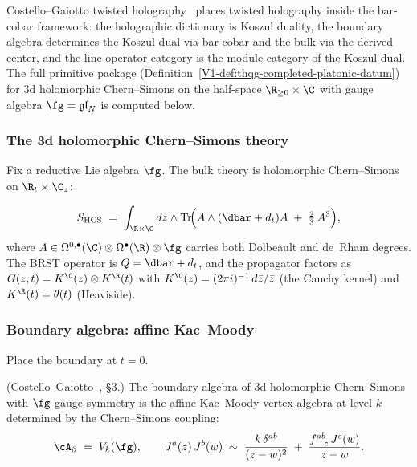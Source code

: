Costello--Gaiotto twisted holography~\cite{costello-gaiotto,Gai19}
places twisted holography inside the bar-cobar framework:
the holographic dictionary is Koszul duality,
the boundary algebra determines the Koszul dual via bar-cobar
and the bulk via the derived center,
and the line-operator category is the module category of the Koszul dual.
The full primitive package
(Definition~\ref*{V1-def:thqg-completed-platonic-datum}) for
3d holomorphic Chern--Simons on the half-space
$\R_{\ge 0} \times \C$ with gauge algebra $\fg = \mathfrak{gl}_N$
is computed below.

\subsubsection{The 3d holomorphic Chern--Simons theory}

Fix a reductive Lie algebra $\fg$.
The bulk theory is holomorphic Chern--Simons on $\R_t \times \C_z$:

\begin{equation}\label{eq:tw-hol-hcs-action}
S_{\mathrm{HCS}}
\;=\;
\int_{\R \times \C}
dz \wedge \operatorname{Tr}\!\Bigl(
A \wedge (\dbar + d_t) A
\;+\; \tfrac{2}{3}\, A^3
\Bigr),
\end{equation}
where $A \in \Omega^{0,\bullet}(\C) \otimes \Omega^\bullet(\R) \otimes \fg$
carries both Dolbeault and de~Rham degrees. The BRST operator is
$Q = \dbar + d_t$, and the propagator factors as
$G(z,t) = K^{\C}(z) \otimes K^{\R}(t)$
with $K^{\C}(z) = (2\pi i)^{-1}\, d\bar z / \bar z$ (the Cauchy kernel)
and $K^{\R}(t) = \theta(t)$ (Heaviside).

\subsubsection{Boundary algebra: affine Kac--Moody}

Place the boundary at $t = 0$.

\begin{proposition}
\label{prop:tw-hol-boundary-KM}
\textup{(Costello--Gaiotto~\cite{costello-gaiotto}, \S3.)}
The boundary algebra of 3d holomorphic Chern--Simons with
$\fg$-gauge symmetry is the affine Kac--Moody vertex algebra at
level $k$ determined by the Chern--Simons coupling:
\[
\cA_\partial \;=\; V_k(\fg),
\qquad
J^a(z)\, J^b(w) \;\sim\;
\frac{k\, \delta^{ab}}{(z-w)^2}
\;+\;
\frac{f^{ab}_{\phantom{ab}c}\, J^c(w)}{z-w}.
\]
\end{proposition}

